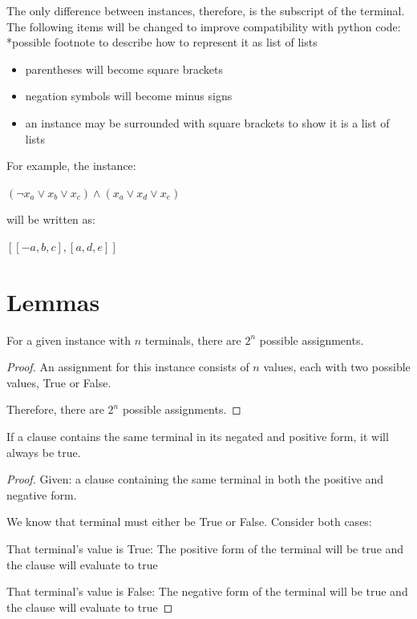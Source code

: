 \documentclass[manuscript]{acmart}
\begin{document}
    The only difference between instances, therefore, is the subscript of the terminal.
    The following items will be changed to improve compatibility with python code:
    *possible footnote to describe how to represent it as list of lists
    \begin{itemize}
        \item parentheses will become square brackets
        \item negation symbols will become minus signs
        \item an instance may be surrounded with square brackets to show it is a list of lists
    \end{itemize}
   
    For example, the instance:
    
    $(\neg x_a \lor x_b \lor x_c) \land (x_a \lor x_d \lor x_e)$

    will be written as:

    $[[-a, b, c], [a, d, e]]$


    \section{Lemmas}

    \begin{lemma}        
        For a given instance with $n$ terminals, there are $2^n$ possible assignments.
    \end{lemma}
    \begin{proof}
        An assignment for this instance consists of $n$ values, each with two possible
        values, True or False.

        Therefore, there are $2^n$ possible assignments.
    \end{proof}

    \begin{lemma}
        If a clause contains the same terminal in its negated and positive form, it will
        always be true.
    \end{lemma}
    \begin{proof}
        Given: a clause containing the same terminal in both the positive and
        negative form.

        We know that terminal must either be True or False. Consider both cases:

        That terminal's value is True:
        The positive form of the terminal will be true and the clause will evaluate to true

        That terminal's value is False:
        The negative form of the terminal will be true and the clause will evaluate to true
    \end{proof}
\end{document}

